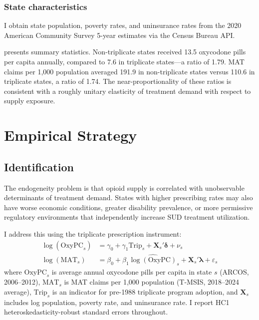 \documentclass[12pt]{article}
\begin{document}
\subsubsection*{State characteristics} I obtain state population, poverty rates, and uninsurance rates from the 2020 American Community Survey 5-year estimates via the Census Bureau API.



 presents summary statistics. Non-triplicate states received 13.5 oxycodone pills per capita annually, compared to 7.6 in triplicate states---a ratio of 1.79. MAT claims per 1,000 population averaged 191.9 in non-triplicate states versus 110.6 in triplicate states, a ratio of 1.74. The near-proportionality of these ratios is consistent with a roughly unitary elasticity of treatment demand with respect to supply exposure.

\section{Empirical Strategy}

\subsection{Identification}

The endogeneity problem is that opioid supply is correlated with unobservable determinants of treatment demand. States with higher prescribing rates may also have worse economic conditions, greater disability prevalence, or more permissive regulatory environments that independently increase SUD treatment utilization.

I address this using the triplicate prescription instrument:
\begin{align}
\log(\text{OxyPC}_s) &= \gamma_0 + \gamma_1 \text{Trip}_s + \mathbf{X}_s'\boldsymbol{\delta} + \nu_s \label{eq:fs} \\
\log(\text{MAT}_s) &= \beta_0 + \beta_1 \widehat{\log(\text{OxyPC})}_s + \mathbf{X}_s'\boldsymbol{\lambda} + \varepsilon_s \label{eq:ss}
\end{align}
where $\text{OxyPC}_s$ is average annual oxycodone pills per capita in state $s$ (ARCOS, 2006--2012), $\text{MAT}_s$ is MAT claims per 1,000 population (T-MSIS, 2018--2024 average), $\text{Trip}_s$ is an indicator for pre-1988 triplicate program adoption, and $\mathbf{X}_s$ includes log population, poverty rate, and uninsurance rate. I report HC1 heteroskedasticity-robust standard errors throughout.
\end{document}
